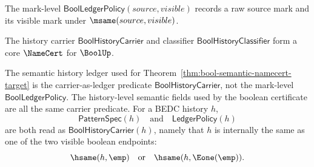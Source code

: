 \begin{definition}
\label{def:bool-ledger-policy}
The mark-level $\mathsf{BoolLedgerPolicy}(source,visible)$ records a raw
source mark and its visible mark under $\msame(source,visible)$.
\end{definition}

\begin{theorem}
\label{thm:concrete-bool-namecert}
The history carrier $\mathsf{BoolHistoryCarrier}$ and classifier $\mathsf{BoolHistoryClassifier}$ form a core $\NameCert$ for $\BoolUp$.
\end{theorem}

\begin{definition}
\label{def:bool-history-semantic-fields}
The semantic history ledger used for
Theorem~\ref{thm:bool-semantic-namecert-target} is the carrier-as-ledger
predicate $\mathsf{BoolHistoryCarrier}$, not the mark-level
$\mathsf{BoolLedgerPolicy}$.
The history-level semantic fields used by the boolean certificate are all the
same carrier predicate.  For a BEDC history $h$,
$$
  \mathsf{PatternSpec}(h)
  \quad\text{and}\quad
  \mathsf{LedgerPolicy}(h)
$$
are both read as $\mathsf{BoolHistoryCarrier}(h)$, namely that $h$ is
internally the same as one of the two visible boolean endpoints:
$$
  \hsame(h,\emp)
  \quad\text{or}\quad
  \hsame(h,\Eone(\emp)).
$$
\end{definition}

